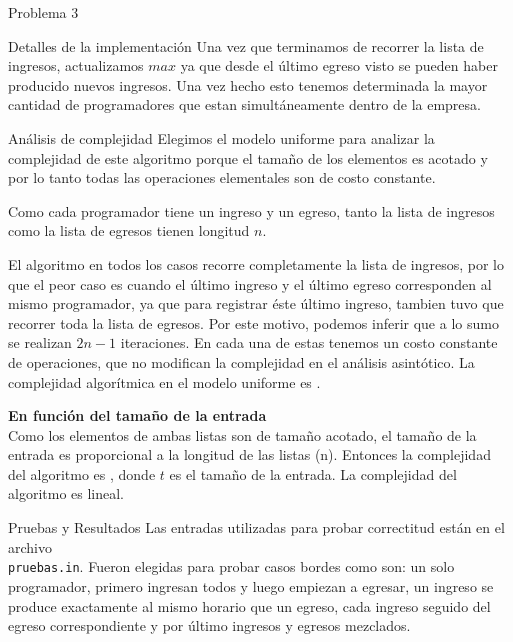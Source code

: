 \begin{section}{Problema 3}
\begin{subsection}{Detalles de la implementación}
	Una vez que terminamos de recorrer la lista de ingresos, actualizamos $max$ ya que desde el último egreso visto se pueden haber producido nuevos ingresos. Una vez hecho esto tenemos determinada la mayor cantidad de programadores que estan simultáneamente dentro de la empresa.
	\end{subsection}

	\begin{subsection}{Análisis de complejidad}
			Elegimos el modelo uniforme para analizar la complejidad de este algoritmo porque el tamaño de los elementos es acotado y por lo tanto todas las operaciones elementales son de costo constante.\Pa
			
			Como cada programador tiene un ingreso y un egreso, tanto la lista de ingresos como la lista de egresos tienen longitud $n$.

El algoritmo en todos los casos recorre completamente la lista de ingresos, por lo que el peor caso es cuando el último ingreso y el último egreso corresponden al mismo programador, ya que para registrar éste último ingreso, tambien tuvo que recorrer toda la lista de egresos. Por este motivo, podemos inferir que a lo sumo se realizan $2n -1$ iteraciones. En cada una de estas tenemos un costo constante de operaciones, que no modifican la complejidad en el análisis asintótico. La complejidad algorítmica en el modelo uniforme es .\VSP

		\noindent\textbf{En función del tamaño de la entrada}\\

			Como los elementos de ambas listas son de tamaño acotado, el tamaño de la entrada es proporcional a la longitud de las listas (n). Entonces la complejidad del algoritmo es , donde $t$ es el tamaño de la entrada. La complejidad del algoritmo es lineal.
	\end{subsection}

	\begin{subsection}{Pruebas y Resultados}
	Las entradas utilizadas para probar correctitud están en el archivo\\ \texttt{pruebas.in}. Fueron elegidas para probar casos bordes como son: un solo programador, primero ingresan todos y luego empiezan a egresar, un ingreso se produce exactamente al mismo horario que un egreso, cada ingreso seguido del egreso correspondiente y por último ingresos y egresos mezclados.


\end{subsection}
\end{section}
